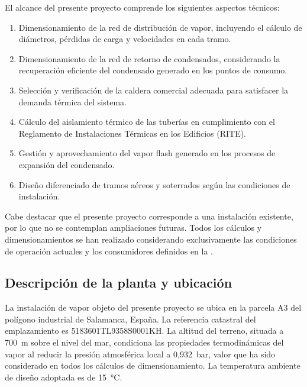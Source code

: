 El alcance del presente proyecto comprende los siguientes aspectos técnicos:

\begin{enumerate}[label=\arabic*., leftmargin=2em]
	\item Dimensionamiento de la red de distribución de vapor, incluyendo el cálculo de diámetros, pérdidas de carga y velocidades en cada tramo.
	\item Dimensionamiento de la red de retorno de condensados, considerando la recuperación eficiente del condensado generado en los puntos de consumo.
	\item Selección y verificación de la caldera comercial adecuada para satisfacer la demanda térmica del sistema.
	\item Cálculo del aislamiento térmico de las tuberías en cumplimiento con el Reglamento de Instalaciones Térmicas en los Edificios (RITE).
	\item Gestión y aprovechamiento del vapor flash generado en los procesos de expansión del condensado.
	\item Diseño diferenciado de tramos aéreos y soterrados según las condiciones de instalación.
\end{enumerate}

Cabe destacar que el presente proyecto corresponde a una instalación existente, por lo que no se contemplan ampliaciones futuras. Todos los cálculos y dimensionamientos se han realizado considerando exclusivamente las condiciones de operación actuales y los consumidores definidos en la .


\subsection{Descripción de la planta y ubicación}
\label{subsec:descripcion-planta-ubicacion}

La instalación de vapor objeto del presente proyecto se ubica en la parcela A3 del polígono industrial de Salamanca, España. La referencia catastral del emplazamiento es 5183601TL9358S0001KH. La altitud del terreno, situada a 700~m sobre el nivel del mar, condiciona las propiedades termodinámicas del vapor al reducir la presión atmosférica local a 0,932~bar, valor que ha sido considerado en todos los cálculos de dimensionamiento. La temperatura ambiente de diseño adoptada es de 15~°C.

